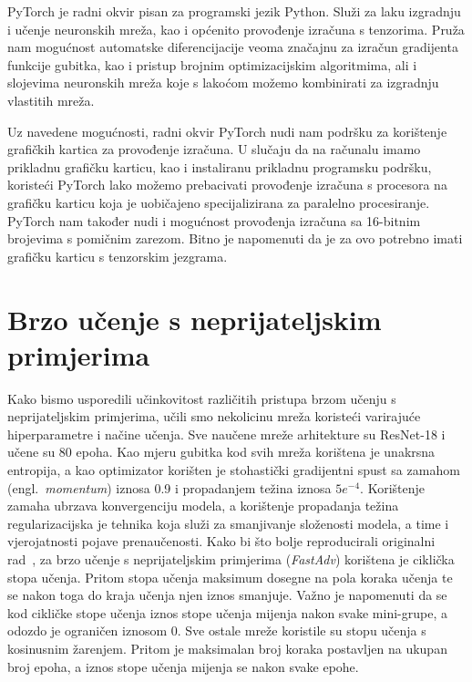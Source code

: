 \documentclass[times, utf8, zavrsni, numeric]{fer}
\begin{document}
PyTorch je radni okvir pisan za programski jezik Python.
Služi za laku izgradnju i učenje neuronskih mreža, kao i općenito provođenje izračuna s tenzorima.
Pruža nam mogućnost automatske diferencijacije veoma značajnu za izračun gradijenta funkcije gubitka, kao i pristup brojnim optimizacijskim algoritmima, 
ali i slojevima neuronskih mreža koje s lakoćom možemo kombinirati za izgradnju vlastitih mreža.

Uz navedene mogućnosti, radni okvir PyTorch nudi nam podršku za korištenje grafičkih kartica za provođenje izračuna.
U slučaju da na računalu imamo prikladnu grafičku karticu, kao i instaliranu prikladnu programsku podršku, 
koristeći PyTorch lako možemo prebacivati provođenje izračuna s procesora na grafičku karticu koja je uobičajeno specijalizirana za paralelno procesiranje.
PyTorch nam također nudi i mogućnost provođenja izračuna sa 16-bitnim brojevima s pomičnim zarezom. Bitno je napomenuti da je za ovo potrebno imati grafičku karticu s tenzorskim jezgrama.

\section{Brzo učenje s neprijateljskim primjerima}

Kako bismo usporedili učinkovitost različitih pristupa brzom učenju s neprijateljskim primjerima, učili smo nekolicinu mreža koristeći varirajuće hiperparametre i načine učenja.
Sve naučene mreže arhitekture su ResNet-18 i učene su 80 epoha. Kao mjeru gubitka kod svih mreža korištena je unakrsna entropija,
a kao optimizator korišten je stohastički gradijentni spust sa zamahom (engl.\ \textit{momentum}) iznosa 0.9 i propadanjem težina iznosa $5e^{-4}$.
Korištenje zamaha ubrzava konvergenciju modela, a korištenje propadanja težina regularizacijska je tehnika koja služi za smanjivanje složenosti modela, a time i vjerojatnosti pojave prenaučenosti.
Kako bi što bolje reproducirali originalni rad~\cite{wong2020fast}, 
za brzo učenje s neprijateljskim primjerima (\textit{FastAdv}) korištena je ciklička stopa učenja. Pritom stopa učenja maksimum dosegne na pola koraka učenja te se nakon toga do kraja učenja njen iznos smanjuje. 
Važno je napomenuti da se kod cikličke stope učenja iznos stope učenja mijenja nakon svake mini-grupe, a odozdo je ograničen iznosom 0.
Sve ostale mreže koristile su stopu učenja s kosinusnim žarenjem. Pritom je maksimalan broj koraka postavljen na ukupan broj epoha, a iznos stope učenja mijenja se nakon svake epohe.
\end{document}

